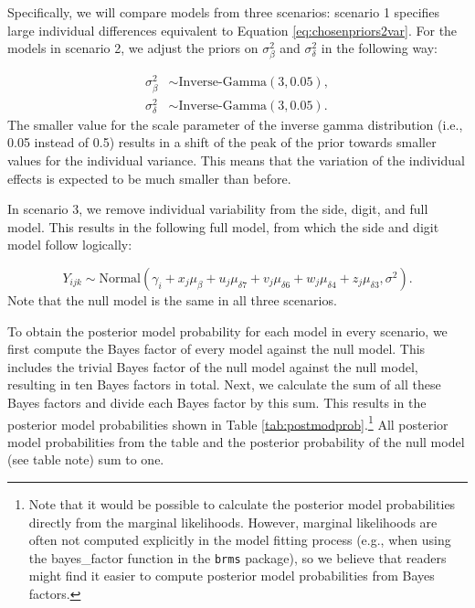 \documentclass[
  english,
  doc,floatsintext]{apa6}
\begin{document}
Specifically, we will compare models from three scenarios: scenario 1 specifies large individual differences equivalent to Equation \eqref{eq:chosenpriors2var}. For the models in scenario 2, we adjust the priors on \(\sigma^2_{\beta}\) and \(\sigma^2_{\delta}\) in the following way:

\begin{equation}
\begin{aligned}
\sigma^2_{\beta} &\sim \text{Inverse-Gamma}(3, 0.05), \\   
\sigma^2_{\delta} &\sim \text{Inverse-Gamma}(3, 0.05). 
\end{aligned}
\end{equation}
The smaller value for the scale parameter of the inverse gamma distribution (i.e., 0.05 instead of 0.5) results in a shift of the peak of the prior towards smaller values for the individual variance. This means that the variation of the individual effects is expected to be much smaller than before.

In scenario 3, we remove individual variability from the side, digit, and full model. This results in the following full model, from which the side and digit model follow logically:

\begin{equation}
Y_{ijk} \sim \text{Normal}(\gamma_{i} + x_j \mu_\beta + u_j \mu_{\delta{7}} + v_j \mu_{\delta{6}} + w_j \mu_{\delta{4}} + z_j \mu_{\delta{3}}, \sigma^2). \label{eq:datalevel2}
\end{equation}
Note that the null model is the same in all three scenarios.

To obtain the posterior model probability for each model in every scenario, we first compute the Bayes factor of every model against the null model. This includes the trivial Bayes factor of the null model against the null model, resulting in ten Bayes factors in total. Next, we calculate the sum of all these Bayes factors and divide each Bayes factor by this sum. This results in the posterior model probabilities shown in Table \ref{tab:postmodprob}.\footnote{Note that it would be possible to calculate the posterior model probabilities directly from the marginal likelihoods. However, marginal likelihoods are often not computed explicitly in the model fitting process (e.g., when using the bayes\_factor function in the \texttt{brms} package), so we believe that readers might find it easier to compute posterior model probabilities from Bayes factors.} All posterior model probabilities from the table and the posterior probability of the null model (see table note) sum to one.
\end{document}
